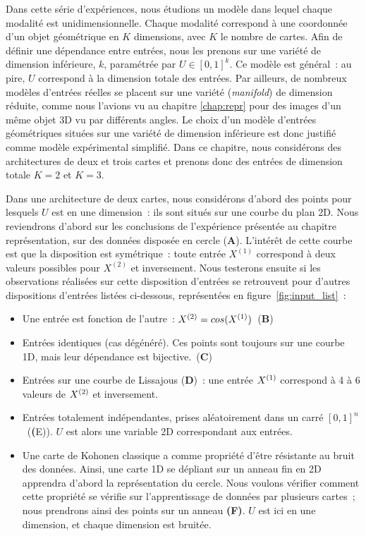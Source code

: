 \documentclass[../main]{subfiles}
\begin{document}
Dans cette série d'expériences, nous étudions un modèle dans lequel chaque modalité est unidimensionnelle. Chaque modalité correspond à une coordonnée d'un objet géométrique en $K$ dimensions, avec  $K$ le nombre de cartes. Afin de définir une dépendance entre entrées, nous les prenons sur une variété de dimension inférieure, $k$,  paramétrée par $U \in [0,1]^k$.
Ce modèle est général~: au pire, $U$ correspond à la dimension totale des entrées. 
Par ailleurs, de nombreux modèles d'entrées réelles se placent sur une variété (\emph{manifold}) de dimension réduite, comme nous l'avions vu au chapitre \ref{chap:repr} pour des images d'un même objet 3D vu par différents angles. Le choix d'un modèle d'entrées géométriques situées sur une variété de dimension inférieure est donc justifié comme modèle expérimental simplifié.
Dans ce chapitre, nous considérons des architectures de deux et trois cartes et prenons donc des entrées de dimension totale $K = 2$ et $K = 3$.


Dans une architecture de deux cartes, nous considérons d'abord des points pour lesquels $U$ est en une dimension~: ils sont situés sur une courbe du plan 2D.
Nous reviendrons d'abord  sur les conclusions de l'expérience présentée au chapitre représentation, sur des données disposée en cercle (\textbf{A}). L'intérêt de cette courbe est que la disposition est symétrique~: toute entrée $X^{(1)}$ correspond à deux valeurs possibles pour $X^{(2)}$ et inversement.
Nous testerons ensuite si les observations réalisées sur cette disposition d'entrées se retrouvent pour d'autres dispositions d'entrées listées ci-dessous, représentées en figure~\ref{fig:input_list}~:
\begin{itemize}
	\item Une entrée est fonction de l'autre~: $X^{({2})} = cos(X^{({1})})$~(\textbf{B})
	\item Entrées identiques (cas dégénéré). Ces points sont toujours sur une courbe 1D, mais leur dépendance est bijective.~(\textbf{C})
	\item Entrées sur une courbe de Lissajous (\textbf{D})~: une entrée $X^{({1})}$ correspond à 4 à 6 valeurs de $X^{({2})}$ et inversement.
	\item Entrées totalement indépendantes, prises aléatoirement dans un carré $[0,1]^n$~(\textbf({E})). $U$ est alors une variable 2D correspondant aux entrées.
	\item Une carte de Kohonen classique a comme propriété d'être résistante au bruit des données. Ainsi, une carte 1D se dépliant sur un anneau fin en 2D apprendra d'abord la représentation du cercle. Nous voulons vérifier comment cette propriété se vérifie sur l'apprentissage de données par plusieurs cartes~; nous prendrons ainsi des points sur un anneau \textbf{(F)}. $U$ est ici en une dimension, et chaque dimension est bruitée.
\end{itemize}
\end{document}
